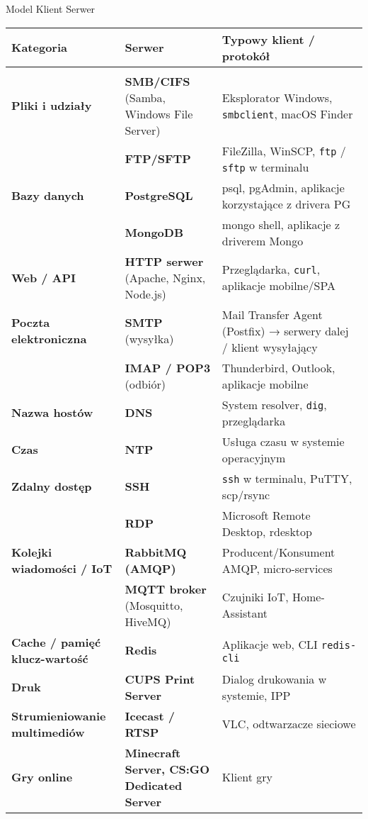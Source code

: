 \documentclass[10pt,compress,usenames,dvipsnames,aspectratio=169]{beamer}
\begin{document}
\begin{frame}{Model Klient Serwer}
  \vfill
  {\tiny
  \begin{center}
    \begin{tabular}{p{3cm} p{4.5cm} p{6cm}}
      \textbf{Kategoria} & \textbf{Serwer} & \textbf{Typowy klient / protokół} \\[0.5ex]
      \hline
      \\
      \textbf{Pliki i udziały} &
        \textbf{SMB/CIFS} (Samba, Windows File Server) &
        Eksplorator Windows, \texttt{smbclient}, macOS Finder \\[0.5ex]
       &
        \textbf{FTP/SFTP} &
        FileZilla, WinSCP, \texttt{ftp} / \texttt{sftp} w terminalu \\[1ex]
      \textbf{Bazy danych} &
        \textbf{PostgreSQL} &
        psql, pgAdmin, aplikacje korzystające z drivera PG \\[0.5ex]
       &
        \textbf{MongoDB} &
        mongo shell, aplikacje z driverem Mongo \\[1ex]
      \textbf{Web / API} &
        \textbf{HTTP serwer} (Apache, Nginx, Node.js) &
        Przeglądarka, \texttt{curl}, aplikacje mobilne/SPA \\[1ex]
      \textbf{Poczta elektroniczna} &
        \textbf{SMTP} (wysyłka) &
        Mail Transfer Agent (Postfix) → serwery dalej / klient wysyłający \\[0.5ex]
       &
        \textbf{IMAP / POP3} (odbiór) &
        Thunderbird, Outlook, aplikacje mobilne \\[1ex]
      \textbf{Nazwa hostów} &
        \textbf{DNS} &
        System resolver, \texttt{dig}, przeglądarka \\[1ex]
      \textbf{Czas} &
        \textbf{NTP} &
        Usługa czasu w systemie operacyjnym \\[1ex]
      \textbf{Zdalny dostęp} &
        \textbf{SSH} &
        \texttt{ssh} w terminalu, PuTTY, scp/rsync \\[0.5ex]
       &
        \textbf{RDP} &
        Microsoft Remote Desktop, rdesktop \\[1ex]
      \textbf{Kolejki wiadomości / IoT} &
        \textbf{RabbitMQ (AMQP)} &
        Producent/Konsument AMQP, micro-services \\[0.5ex]
       &
        \textbf{MQTT broker} (Mosquitto, HiveMQ) &
        Czujniki IoT, Home-Assistant \\[1ex]
      \textbf{Cache / pamięć klucz-wartość} &
        \textbf{Redis} &
        Aplikacje web, CLI \texttt{redis-cli} \\[1ex]
      \textbf{Druk} &
        \textbf{CUPS Print Server} &
        Dialog drukowania w systemie, IPP \\[1ex]
      \textbf{Strumieniowanie multimediów} &
        \textbf{Icecast / RTSP} &
        VLC, odtwarzacze sieciowe \\[1ex]
      \textbf{Gry online} &
        \textbf{Minecraft Server, CS:GO Dedicated Server} &
        Klient gry \\
    \end{tabular}
  \end{center}

}
\end{frame}
\end{document}
